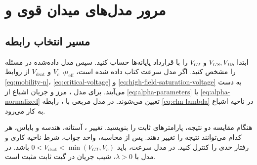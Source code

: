 \chapter*{مرور مدل‌های میدان قوی و }
\section*{مسیر انتخاب رابطه}
ابتدا \(V_{GS},V_{DS}\) و \(V_{GT}\) را با قرارداد پایانه‌ها حساب کنید.
سپس مدل داده‌شده در مسئله را مشخص کنید. اگر مدل سرعت کتاب داده شده است،
\(\mu_{\mathrm{eff}}\)، \(V_c\) و
\(V_{\mathrm{dsat}}\) از روابط \eqref{eq:mobility-n}،
\eqref{eq:critical-voltage} و \eqref{eq:high-field-saturation-voltage}
به دست می‌آیند. برای مدل ، مرز و جریان اشباع از
\eqref{eq:alpha-parameters} یا \eqref{eq:alpha-normalized} تعیین می‌شوند.
در مدل مربعی با ، رابطه
\eqref{eq:clm-lambda} در ناحیه اشباع به کار می‌رود.

هنگام مقایسه دو نتیجه، پارامترهای ثابت را بنویسید. تغییر ،
آستانه، هندسه و بایاس، هر کدام می‌توانند نتیجه را تغییر دهند.
پس از محاسبه، واحد جواب، شرط ناحیه کاری و رفتار حدی را کنترل کنید.
در مدل سرعت، باید \(0<V_{\mathrm{dsat}}<\min(V_{GT},V_c)\) باشد.
در مدل  با \(\lambda>0\)، شیب جریان در گیت ثابت مثبت است.

